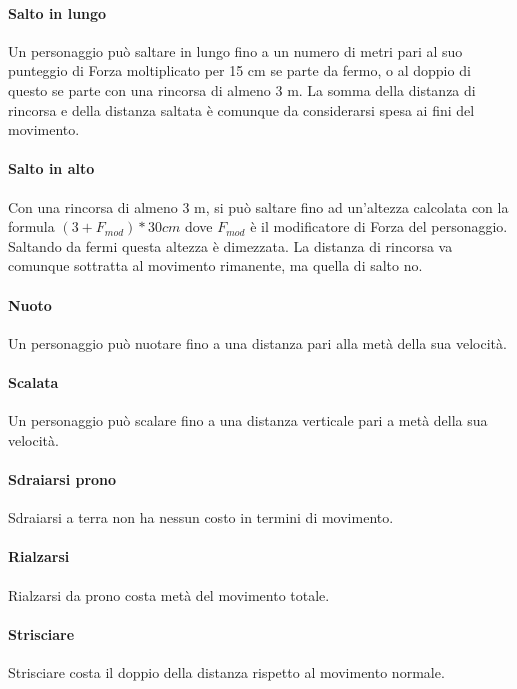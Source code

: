 \paragraph{Salto in lungo}
Un personaggio può saltare in lungo fino a un numero di metri pari al suo punteggio di Forza moltiplicato per 15 cm se parte da fermo, o al doppio di questo se parte con una rincorsa di almeno 3 m. La somma della distanza di rincorsa e della distanza saltata è comunque da considerarsi spesa ai fini del movimento.\\
\paragraph{Salto in alto}
Con una rincorsa di almeno 3 m, si può saltare fino ad un'altezza calcolata con la formula $(3 + F_{mod})*30cm$ dove $F_{mod}$ è il modificatore di Forza del personaggio. Saltando da fermi questa altezza è dimezzata. La distanza di rincorsa va comunque sottratta al movimento rimanente, ma quella di salto no.\\
\paragraph{Nuoto}
Un personaggio può nuotare fino a una distanza pari alla metà della sua velocità.\\
\paragraph{Scalata}
Un personaggio può scalare fino a una distanza verticale pari a metà della sua velocità.\\
\paragraph{Sdraiarsi prono}
Sdraiarsi a terra non ha nessun costo in termini di movimento.\\
\paragraph{Rialzarsi}
Rialzarsi da prono costa metà del movimento totale.\\
\paragraph{Strisciare}
Strisciare costa il doppio della distanza rispetto al movimento normale.\\

